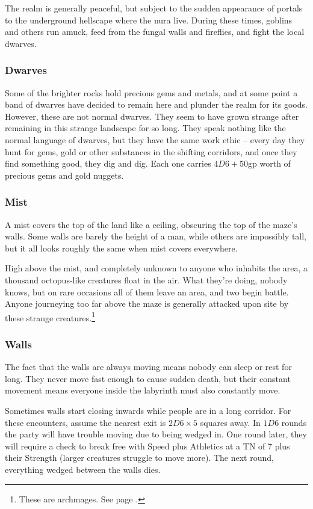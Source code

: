 \begin{multicols}{2}
The realm is generally peaceful, but subject to the sudden appearance of portals to the underground hellscape where the nura live.
During these times, goblins and others run amuck, feed from the fungal walls and fireflies, and fight the local dwarves.

\subsubsection{Dwarves}

Some of the brighter rocks hold precious gems and metals, and at some point a band of dwarves have decided to remain here and plunder the realm for its goods.
However, these are not normal dwarves.
They seem to have grown strange after remaining in this strange landscape for so long.
They speak nothing like the normal language of dwarves, but they have the same work ethic -- every day they hunt for gems, gold or other substances in the shifting corridors, and once they find something good, they dig and dig.
Each one carries $4D6 + 50$gp worth of precious gems and gold nuggets.

\subsubsection{Mist}

A mist covers the top of the land like a ceiling, obscuring the top of the maze's walls.  Some walls are barely the height of a man, while others are impossibly tall, but it all looks roughly the same when mist covers everywhere.

High above the mist, and completely unknown to anyone who inhabits the area, a thousand octopus-like creatures float in the air.
What they're doing, nobody knows, but on rare occasions all of them leave an area, and two begin battle.
Anyone journeying too far above the maze is generally attacked upon site by these strange creatures.\footnote{These are archmages. See page \pageref{archmage}.}

\subsubsection{Walls}

The fact that the walls are always moving means nobody can sleep or rest for long.
They never move fast enough to cause sudden death, but their constant movement means everyone inside the labyrinth must also constantly move.

Sometimes walls start closing inwards while people are in a long corridor.
For these encounters, assume the nearest exit is $2D6\times 5$ squares away.
In $1D6$ rounds the party will have trouble moving due to being wedged in.
One round later, they will require a check to break free with Speed plus Athletics at a TN of 7 plus their Strength (larger creatures struggle to move more).  The next round, everything wedged between the walls dies. 


\end{multicols}
